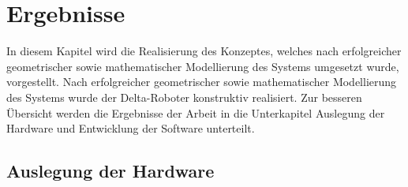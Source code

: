 \documentclass[Bachelor, BMR, ngerman]{twbook}
\begin{document}
\chapter{Ergebnisse} 
\label{cap:ergebnisse}

    In diesem Kapitel wird die Realisierung des Konzeptes, welches nach erfolgreicher geometrischer sowie mathematischer Modellierung des Systems umgesetzt wurde, vorgestellt. Nach erfolgreicher geometrischer sowie mathematischer Modellierung des Systems wurde der Delta-Roboter konstruktiv realisiert. Zur besseren Übersicht werden die Ergebnisse der Arbeit in die Unterkapitel Auslegung der Hardware und Entwicklung der Software unterteilt.
    
    \section{Auslegung der Hardware}
    
\end{document}
